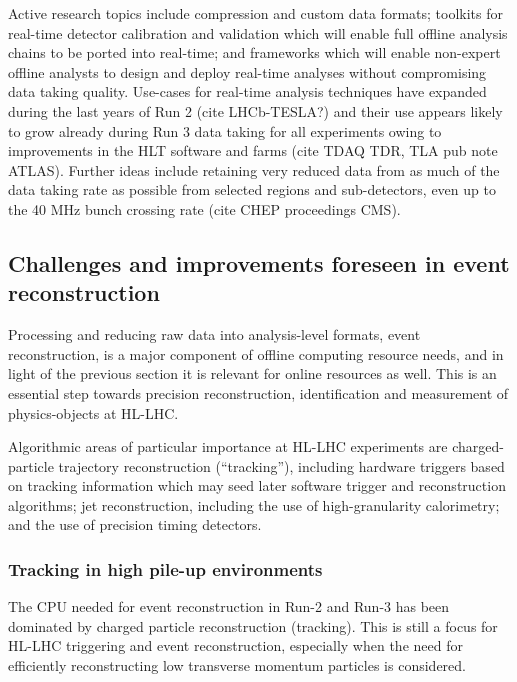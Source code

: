 \documentclass[10pt,a4paper]{article}
\begin{document}
Active research topics include compression and custom data formats;
toolkits for real-time detector calibration and validation which will
enable full offline analysis chains to be ported into real-time; and
frameworks which will enable non-expert offline analysts to design and
deploy real-time analyses without compromising data taking quality.
Use-cases for real-time analysis techniques have expanded during the
last years of Run 2 (cite LHCb-TESLA?) and their use appears likely to
grow already during Run 3 data taking for all experiments owing to
improvements in the HLT software and farms (cite TDAQ TDR, TLA pub note
ATLAS). Further ideas include retaining very reduced data from as much
of the data taking rate as possible from selected regions and
sub-detectors, even up to the 40 MHz bunch crossing rate (cite CHEP
proceedings CMS).

\hypertarget{challenges-and-improvements-foreseen-in-event-reconstruction}{%
\subsection{Challenges and improvements foreseen in event
reconstruction}\label{challenges-and-improvements-foreseen-in-event-reconstruction}}

Processing and reducing raw data into analysis-level formats, event
reconstruction, is a major component of offline computing resource
needs, and in light of the previous section it is relevant for online
resources as well. This is an essential step towards precision
reconstruction, identification and measurement of physics-objects at
HL-LHC.

Algorithmic areas of particular importance at HL-LHC experiments are
charged-particle trajectory reconstruction (``tracking''), including
hardware triggers based on tracking information which may seed later
software trigger and reconstruction algorithms; jet reconstruction,
including the use of high-granularity calorimetry; and the use of
precision timing detectors.

\hypertarget{tracking-in-high-pile-up-environments}{%
\subsubsection{Tracking in high pile-up
environments}\label{tracking-in-high-pile-up-environments}}

The CPU needed for event reconstruction in Run-2 and Run-3 has been
dominated by charged particle reconstruction (tracking). This is still a
focus for HL-LHC triggering and event reconstruction, especially when
the need for efficiently reconstructing low transverse momentum
particles is considered.
\end{document}
